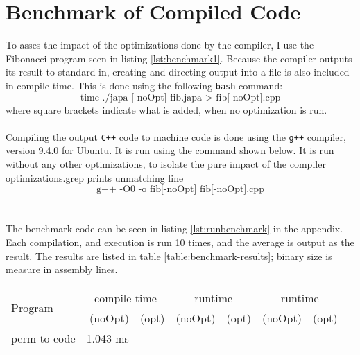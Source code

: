 \section{Benchmark of Compiled Code \ms}
To asses the impact of the optimizations done by the \lan compiler, I use the Fibonacci
program seen in listing \ref{lst:benchmark1}. Because the compiler outputs its result
to standard in, creating and directing output into a file is also included in compile time.
This is done using the following \texttt{bash} command:
$$\text{time ./japa [-noOpt] fib.japa > fib[-noOpt].cpp}$$
\noindent
where square brackets indicate what is added, when no optimization is run.
\\
\\
Compiling the output \texttt{C++} code to machine code is done using the \texttt{g++}
compiler, version 9.4.0 for Ubuntu. It is run using the command shown below. It is run
without any other optimizations, to isolate the pure impact of the \lan compiler
optimizations.grep prints unmatching line
$$\text{g++ -O0 -o fib[-noOpt] fib[-noOpt].cpp}$$
\\
\\
The benchmark code can be seen in listing \ref{lst:runbenchmark} in the appendix.
Each compilation, and execution is run 10 times, and the average is output as the
result. The results are listed in table \ref{table:benchmark-results}; binary size
is measure in assembly lines.

\begin{table}[H]
    \centering
    \begin{tabular}{|l|r|r|r|r|r|r|}
        \hline
        \multirow{2}{*}{Program}& \multicolumn{2}{c|}{compile time} & \multicolumn{2}{c|}{runtime} & \multicolumn{2}{c|}{runtime} \\
        \cline{2-7}
        & (noOpt) & (opt) & (noOpt) & (opt) & (noOpt) & (opt) \\
        \hline
        perm-to-code & 1.043 ms & 
    \end{tabular}
\end{table}

